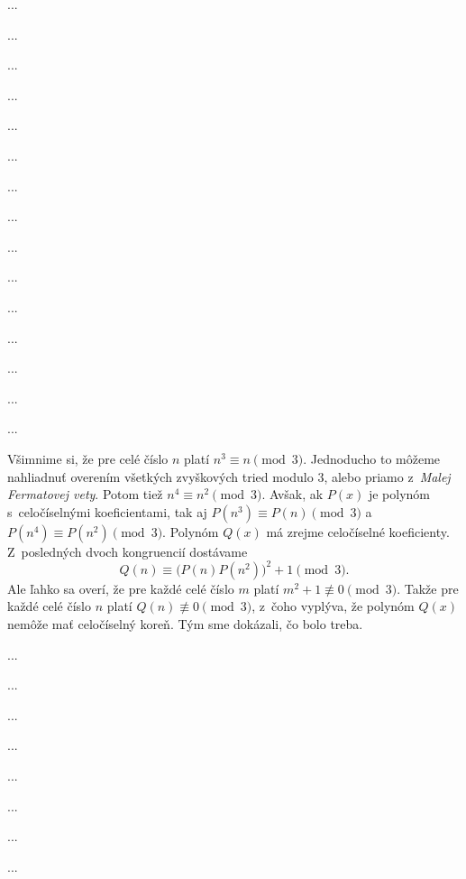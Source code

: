 {%
...}

{%
...}

{%
...}

{%
...}

{%
...}

{%
...}

{%
...}

{%
...}

{%
...}

{%
...}

{%
...}

{%
...}

{%
...}

{%
...}

{%
...}

{%
Všimnime si, že pre celé číslo $n$ platí
$ n^3 \equiv n \pmod3 $.
Jednoducho to môžeme na\-hliad\-nuť overením všetkých zvyškových tried modulo 3,
alebo priamo z~{\it Malej Fermatovej vety}. Potom tiež
$ n^4 \equiv n^2 \pmod3 $.
Avšak, ak $P(x)$ je polynóm s~celočíselnými koeficientami, tak aj
$ P(n^3) \equiv P(n) \pmod3 $
a~$ P(n^4) \equiv P(n^2) \pmod3 $.
Polynóm $Q(x)$ má zrejme celočíselné koeficienty. Z~posledných dvoch
kongruencií dostávame
$$
  Q(n) \equiv \big( P(n)P(n^2) \big)^2  + 1 \pmod3 .
$$
Ale ľahko sa overí, že pre každé celé číslo $m$ platí
$m^2+1\not\equiv 0 \pmod3$.
Takže pre každé celé číslo $n$ platí $Q(n)\not\equiv 0 \pmod3$,
z~čoho vyplýva, že polynóm $Q(x)$ nemôže mať celočíselný koreň.
Tým sme dokázali, čo bolo treba.
}

{%
...}

{%
...}

{%
...}

{%
...}

{%
...}

{%
...}

{%
...}

{%
...}

